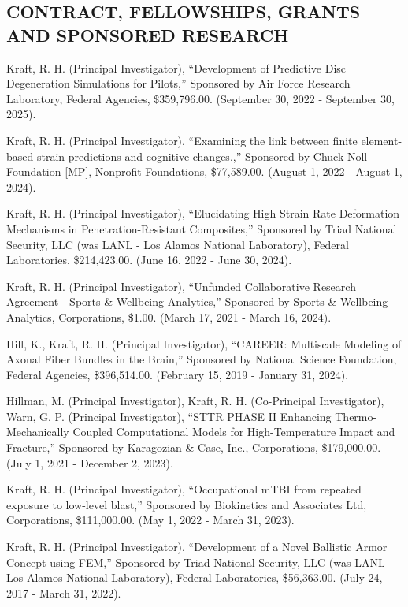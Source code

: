 \documentclass[11pt]{article}
\begin{document}
\subsection{CONTRACT, FELLOWSHIPS, GRANTS AND SPONSORED RESEARCH}\label{contract-fellowships-grants-and-sponsored-research}

Kraft, R. 
H. 
(Principal Investigator), ``Development of Predictive Disc
Degeneration Simulations for Pilots,'' Sponsored by Air Force Research
Laboratory, Federal Agencies, \$359,796.00. 
(September 30, 2022 -
September 30, 2025).

Kraft, R. 
H. 
(Principal Investigator), ``Examining the link between
finite element-based strain predictions and cognitive changes.,''
Sponsored by Chuck Noll Foundation {[}MP{]}, Nonprofit Foundations,
\$77,589.00. 
(August 1, 2022 - August 1, 2024).

Kraft, R. 
H. 
(Principal Investigator), ``Elucidating High Strain Rate
Deformation Mechanisms in Penetration-Resistant Composites,'' Sponsored
by Triad National Security, LLC (was LANL - Los Alamos National
Laboratory), Federal Laboratories, \$214,423.00. 
(June 16, 2022 - June
30, 2024).

Kraft, R. 
H. 
(Principal Investigator), ``Unfunded Collaborative Research
Agreement - Sports \& Wellbeing Analytics,'' Sponsored by Sports \&
Wellbeing Analytics, Corporations, \$1.00. 
(March 17, 2021 - March 16,
2024).

Hill, K., Kraft, R. 
H. 
(Principal Investigator), ``CAREER: Multiscale
Modeling of Axonal Fiber Bundles in the Brain,'' Sponsored by National
Science Foundation, Federal Agencies, \$396,514.00. 
(February 15, 2019 -
January 31, 2024).

Hillman, M. 
(Principal Investigator), Kraft, R. 
H. 
(Co-Principal
Investigator), Warn, G. 
P. 
(Principal Investigator), ``STTR PHASE II
Enhancing Thermo-Mechanically Coupled Computational Models for
High-Temperature Impact and Fracture,'' Sponsored by Karagozian \& Case,
Inc., Corporations, \$179,000.00. 
(July 1, 2021 - December 2, 2023).

Kraft, R. 
H. 
(Principal Investigator), ``Occupational mTBI from repeated
exposure to low-level blast,'' Sponsored by Biokinetics and Associates
Ltd, Corporations, \$111,000.00. 
(May 1, 2022 - March 31, 2023).

Kraft, R. 
H. 
(Principal Investigator), ``Development of a Novel Ballistic
Armor Concept using FEM,'' Sponsored by Triad National Security, LLC (was
LANL - Los Alamos National Laboratory), Federal Laboratories,
\$56,363.00. 
(July 24, 2017 - March 31, 2022).
\end{document}
